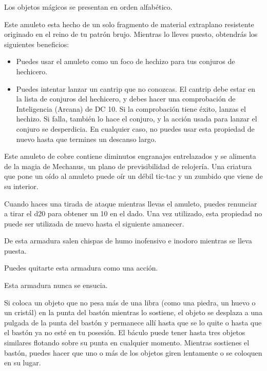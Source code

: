 \documentclass[a4paper,twocolumn,openany,10pt]{dndbook}
\begin{document}
Los objetos mágicos se presentan en orden alfabético. 

Este amuleto esta hecho de un solo fragmento de material extraplano resistente originado en el reino de tu patrón brujo.
Mientras lo lleves puesto, obtendrás los siguientes beneficios:

\begin{itemize}
	\item Puedes usar el amuleto como un foco de hechizo para tus conjuros de hechicero.

	\item Puedes intentar lanzar un cantrip que no conozcas. El cantrip debe estar en la lista de conjuros del hechicero, y
	debes hacer una comprobación de Inteligencia (Arcana) de DC 10. Si la comprobación tiene éxito, lanzas el hechizo. Si falla,
	también lo hace el conjuro, y la acción usada para lanzar el conjuro se desperdicia. En cualquier caso, no puedes usar esta
	propiedad de nuevo hasta que termines un descanso largo. 
\end{itemize}

Este amuleto de cobre contiene diminutos engranajes entrelazados y se alimenta de la magia de Mechanus, un plano de
previsibilidad de relojería. Una criatura que pone un oído al amuleto puede oír un débil tic-tac y un zumbido que viene de su
interior.

Cuando haces una tirada de ataque mientras llevas el amuleto, puedes renunciar a tirar el d20 para obtener un 10 en el dado. Una
vez utilizado, esta propiedad no puede ser utilizada de nuevo hasta el siguiente amanecer. 

De esta armadura salen chispas de humo inofensivo e inodoro mientras se lleva puesta. 

Puedes quitarte esta armadura como una acción.

Esta armadura nunca se ensucia.

Si coloca un objeto que no pesa más de una libra (como una piedra, un huevo o un cristál) en la punta del bastón mientras lo
sostiene, el objeto se desplaza a una pulgada de la punta del bastón y permanece allí hasta que se lo quite o hasta que el
bastón ya no esté en tu posesión. El báculo puede tener hasta tres objetos similares flotando sobre su punta en cualquier
momento. Mientras sostienes el bastón, puedes hacer que uno o más de los objetos giren lentamente o se coloquen en su lugar.
\end{document}

